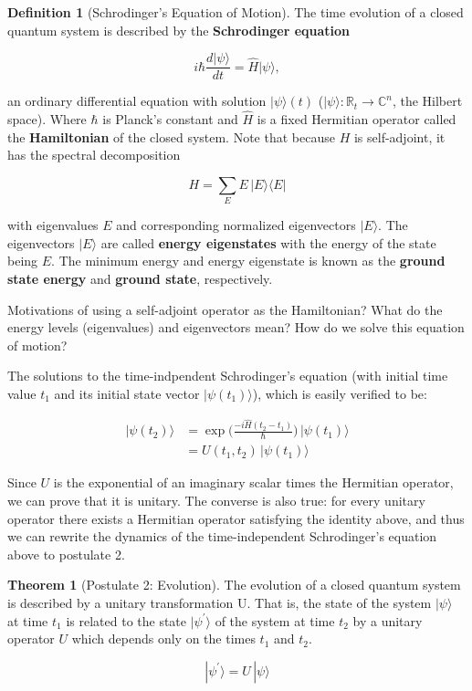 \documentclass{article}
\newenvironment{question}{\color{blue}}{\ignorespacesafterend}
\theoremstyle{definition}
\newtheorem{theorem}{Theorem}[section]
\newtheorem{definition}{Definition}[section]
\begin{document}
    \begin{definition}[Schrodinger's Equation of Motion]
      The time evolution of a closed quantum system is described by the \textbf{Schrodinger equation}

        \[i \hbar \frac{d |\psi \rangle}{dt} = \hat{H} |\psi \rangle, \]

      an ordinary differential equation with solution $| \psi \rangle (t)$ ($|\psi\rangle: \mathbb{R}_t \longrightarrow \mathbb{C}^n$, the Hilbert space). Where $\hbar$ is Planck's constant and $\hat{H}$ is a fixed Hermitian operator called the \textbf{Hamiltonian} of the closed system. Note that because $H$ is self-adjoint, it has the spectral decomposition

        \[H = \sum_{E} E \, |E \rangle \langle E |\]

      with eigenvalues $E$ and corresponding normalized eigenvectors $|E \rangle$. The eigenvectors $|E \rangle$ are called \textbf{energy eigenstates} with the energy of the state being $E$. The minimum energy and energy eigenstate is known as the \textbf{ground state energy} and \textbf{ground state}, respectively.
    \end{definition}

    \begin{question} 
      Motivations of using a self-adjoint operator as the Hamiltonian? What do the energy levels (eigenvalues) and eigenvectors mean? How do we solve this equation of motion? 
    \end{question}

    The solutions to the time-indpendent Schrodinger's equation (with initial time value $t_1$ and its initial state vector $|\psi (t_1)\rangle$), which is easily verified to be:

    \begin{align*}
      |\psi (t_2) \rangle & = \exp \bigg( \frac{-i \hat{H} (t_2 - t_1)}{\hbar} \bigg) \, |\psi(t_1)\rangle \\
      & = U(t_1, t_2) \, |\psi (t_1) \rangle
    \end{align*}

    Since $U$ is the exponential of an imaginary scalar times the Hermitian operator, we can prove that it is unitary. The converse is also true: for every unitary operator there exists a Hermitian operator satisfying the identity above, and thus we can rewrite the dynamics of the time-independent Schrodinger's equation above to postulate 2. 
    
    \begin{theorem}[Postulate 2: Evolution]
      The evolution of a closed quantum system is described by a unitary transformation U. That is, the state of the system $|\psi \rangle$ at time $t_1$ is related to the state $|\psi^\prime \rangle$ of the system at time $t_2$ by a unitary operator $U$ which depends only on the times $t_1$ and $t_2$.

        \[|\psi^\prime \rangle = U \, |\psi \rangle\]
    \end{theorem}
\end{document}
